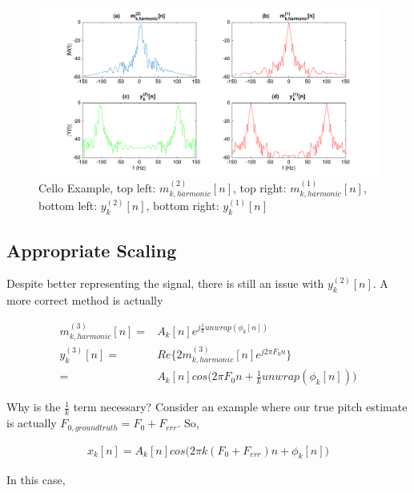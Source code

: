 \documentclass [11pt, proquest,oneside] {ganter_thesis}[2015/03/03]
\begin{document}
\begin{figure}[!ht]
  \centering
    \includegraphics[width=1\textwidth]{matlab/real_vs_magnitude_example}   
    \caption{Cello Example, top left: $m^{(2)}_{k,harmonic}[n]$, top right: $m^{(1)}_{k,harmonic}[n]$, bottom left: $y^{(2)}_k[n]$, bottom right: $y^{(1)}_k[n]$}\label{fig:real_vs_magnitude_example}
\end{figure}


\subsection{Appropriate Scaling}

Despite better representing the signal, there is still an issue with $y_k^{(2)}[n]$.  A more correct method is actually

\begin{align}
\label{eq:realVSmag3}
m^{(3)}_{k,harmonic}[n] =& A_k[n]e^{j\frac{1}{k} unwrap(\phi_k[n])} \\
y_k^{(3)}[n] =& Re\{ 2 m^{(3)}_{k,harmonic}[n] e^{j2\pi F_0 n} \}  \\
=& A_k[n]cos\Big(2\pi F_0 n + \frac{1}{k}unwrap(\phi_k[n])\Big) \nonumber
\end{align}


Why is the $\frac{1}{k}$ term necessary?  Consider an example where our true pitch estimate is actually $F_{0,ground truth} = F_0 + F_{err}$.  So,

\begin{align}
x_k[n] = A_k[n]cos\Big(2\pi k(F_0 + F_{err})n + \phi_k[n]\Big)
\end{align}

In this case,
\end{document}
